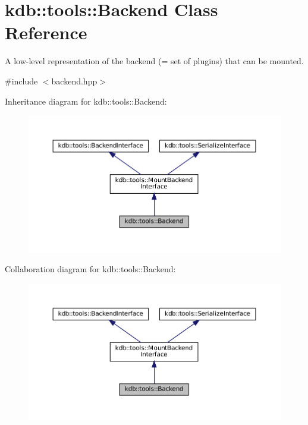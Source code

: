 \hypertarget{classkdb_1_1tools_1_1Backend}{}\section{kdb\+::tools\+::Backend Class Reference}
\label{classkdb_1_1tools_1_1Backend}


A low-\/level representation of the backend (= set of plugins) that can be mounted.  




{\ttfamily \#include $<$backend.\+hpp$>$}



Inheritance diagram for kdb\+::tools\+::Backend\+:
\nopagebreak
\begin{figure}[H]
\begin{center}
\leavevmode
\includegraphics[width=350pt]{classkdb_1_1tools_1_1Backend__inherit__graph}
\end{center}
\end{figure}


Collaboration diagram for kdb\+::tools\+::Backend\+:
\nopagebreak
\begin{figure}[H]
\begin{center}
\leavevmode
\includegraphics[width=350pt]{classkdb_1_1tools_1_1Backend__coll__graph}
\end{center}
\end{figure}
